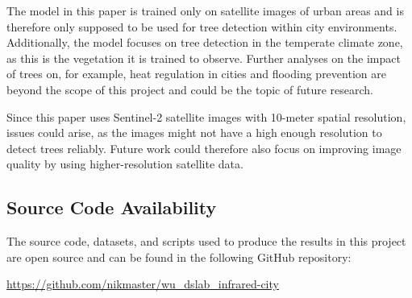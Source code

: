 The model in this paper is trained only on satellite images of urban areas and is therefore only supposed to be used for tree detection within city environments. Additionally, the model focuses on tree detection in the temperate climate zone, as this is the vegetation it is trained to observe. Further analyses on the impact of trees on, for example, heat regulation in cities and flooding prevention are beyond the scope of this project and could be the topic of future research.

Since this paper uses Sentinel-2 satellite images with 10-meter spatial resolution, issues could arise, as the images might not have a high enough resolution to detect trees reliably. Future work could therefore also focus on improving image quality by using higher-resolution satellite data.

\subsection{Source Code Availability}

The source code, datasets, and scripts used to produce the results in this project are open source and can be found in the following GitHub repository:

\url{https://github.com/nikmaster/wu_dslab_infrared-city}